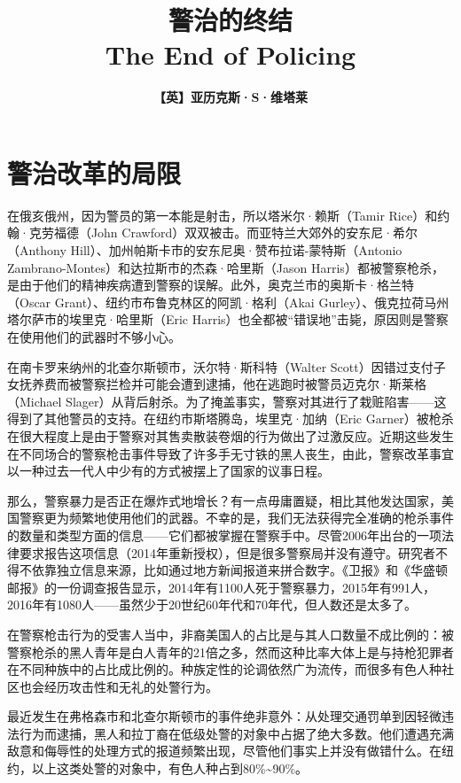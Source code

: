 \documentclass[fontset=fandol, a4paper, 12pt, openright]{ctexbook}
\title{\Huge \textbf{警治的终结}\\ \Large The End of Policing}
\author{\textbf{【英】亚历克斯·S·维塔莱}}
\date{}
\begin{document}
\frontmatter

\maketitle

\tableofcontents

\mainmatter

\chapter{警治改革的局限}

在俄亥俄州，因为警员的第一本能是射击，所以塔米尔·赖斯（Tamir Rice）和约翰·克劳福德（John Crawford）双双被击。而亚特兰大郊外的安东尼·希尔（Anthony Hill）、加州帕斯卡市的安东尼奥·赞布拉诺-蒙特斯（Antonio Zambrano-Montes）和达拉斯市的杰森·哈里斯（Jason Harris）都被警察枪杀，是由于他们的精神疾病遭到警察的误解。此外，奥克兰市的奥斯卡·格兰特（Oscar Grant）、纽约市布鲁克林区的阿凯·格利（Akai Gurley）、俄克拉荷马州塔尔萨市的埃里克·哈里斯（Eric Harris）也全都被“错误地”击毙，原因则是警察在使用他们的武器时不够小心。

在南卡罗来纳州的北查尔斯顿市，沃尔特·斯科特（Walter Scott）因错过支付子女抚养费而被警察拦检并可能会遭到逮捕，他在逃跑时被警员迈克尔·斯莱格（Michael Slager）从背后射杀。为了掩盖事实，警察对其进行了栽赃陷害——这得到了其他警员的支持。在纽约市斯塔腾岛，埃里克·加纳（Eric Garner）被枪杀在很大程度上是由于警察对其售卖散装卷烟的行为做出了过激反应。近期这些发生在不同场合的警察枪击事件导致了许多手无寸铁的黑人丧生，由此，警察改革事宜以一种过去一代人中少有的方式被摆上了国家的议事日程。

那么，警察暴力是否正在爆炸式地增长？有一点毋庸置疑，相比其他发达国家，美国警察更为频繁地使用他们的武器。不幸的是，我们无法获得完全准确的枪杀事件的数量和类型方面的信息——它们都被掌握在警察手中。尽管2006年出台的一项法律要求报告这项信息（2014年重新授权），但是很多警察局并没有遵守。研究者不得不依靠独立信息来源，比如通过地方新闻报道来拼合数字。《卫报》和《华盛顿邮报》的一份调查报告显示，2014年有1100人死于警察暴力，2015年有991人，2016年有1080人——虽然少于20世纪60年代和70年代，但人数还是太多了。

在警察枪击行为的受害人当中，非裔美国人的占比是与其人口数量不成比例的：被警察枪杀的黑人青年是白人青年的21倍之多，然而这种比率大体上是与持枪犯罪者在不同种族中的占比成比例的。种族定性的论调依然广为流传，而很多有色人种社区也会经历攻击性和无礼的处警行为。

最近发生在弗格森市和北查尔斯顿市的事件绝非意外：从处理交通罚单到因轻微违法行为而逮捕，黑人和拉丁裔在低级处警的对象中占据了绝大多数。他们遭遇充满敌意和侮辱性的处理方式的报道频繁出现，尽管他们事实上并没有做错什么。在纽约，以上这类处警的对象中，有色人种占到80\%\textasciitilde90\%。
\end{document}
